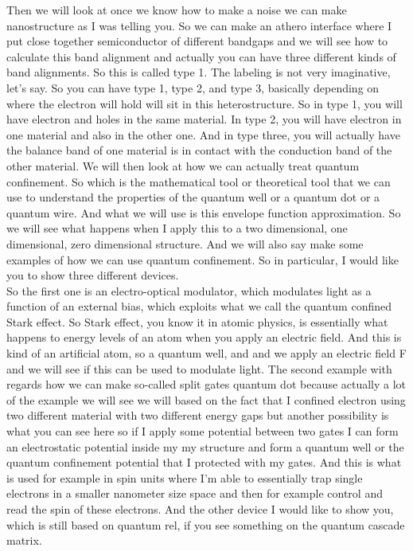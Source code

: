 Then we will look at once we know how to make a noise we can make nanostructure as I was telling you. So we can make an athero interface where I put close together semiconductor of different bandgaps and we will see how to calculate this band alignment and actually you can have three different kinds of band alignments. So this is called type 1. The labeling is not very imaginative, let's say. So you can have type 1, type 2, and type 3, basically depending on where the electron will hold will sit in this heterostructure. So in type 1, you will have electron and holes in the same material. In type 2, you will have electron in one material and also in the other one. And in type three, you will actually have the balance band of one material is in contact with the conduction band of the other material.
We will then look at how we can actually treat quantum confinement. So which is the mathematical tool or theoretical tool that we can use to understand the properties of the quantum well or a quantum dot or a quantum wire. And what we will use is this envelope function approximation. So we will see what happens when I apply this to a two dimensional, one dimensional, zero dimensional structure. And we will also say make some examples of how we can use quantum confinement. So in particular, I would like you to show three different devices.\\
So the first one is an electro-optical modulator, which modulates light as a function of an external bias, which exploits what we call the quantum confined Stark effect. So Stark effect, you know it in atomic physics, is essentially what happens to energy levels of an atom when you apply an electric field. And this is kind of an artificial atom, so a quantum well, and and we apply an electric field F and we will see if this can be used to modulate light. The second example with regards how we can make so-called split gates quantum dot because actually a lot of the example we will see we will based on the fact that I confined electron using two different material with two different energy gaps but another possibility is what you can see here so if I apply some potential between two gates I can form an electrostatic potential inside my my structure and form a quantum well or the quantum confinement potential that I protected with my gates. And this is what is used for example in spin units where I'm able to essentially trap single electrons in a smaller nanometer size space and then for example control and read the spin of these electrons. And the other device I would like to show you, which is still based on quantum rel, if you see something on the quantum cascade matrix.
